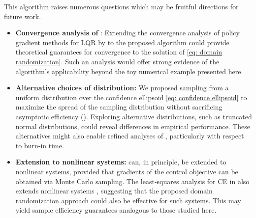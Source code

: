 This algorithm raises numerous questions which may be fruitful directions for future work. 
\begin{itemize} [noitemsep,nolistsep,leftmargin=*]
    \item \textbf{Convergence analysis of }: Extending the convergence analysis of policy gradient methods for LQR by \citet{fazel2018global, hu2023toward} to the proposed algorithm could provide theoretical guarantees for convergence to the solution of \eqref{eq: domain randomization}. Such an analysis would offer strong evidence of the algorithm's applicability beyond the toy numerical example presented here.
    \item \textbf{Alternative choices of distribution:} We proposed sampling from a uniform distribution over the confidence ellipsoid \eqref{eq: confidence ellipsoid} to maximize the spread of the sampling distribution without sacrificing asymptotic efficiency (). Exploring alternative distributions, such as truncated normal distributions, could reveal differences in empirical performance. These alternatives might also enable refined analyses of , particularly with respect to burn-in time.
    \item  \textbf{Extension to nonlinear systems:}   can, in principle, be extended to nonlinear systems, provided that gradients of the control objective can be obtained via Monte Carlo sampling. The least-squares analysis for CE in  also extends nonlinear systems \citep{lee2024active}, suggesting that the proposed domain randomization approach could also be effective for such systems. This may yield sample efficiency guarantees analogous to those studied here.
\end{itemize}

